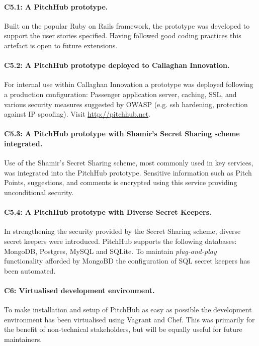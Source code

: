 \paragraph{C5.1: A PitchHub prototype.} 

Built on the popular Ruby on Rails framework, the prototype was developed to support the user stories specified. Having followed good coding practices this artefact is open to future extensions.

\paragraph{C5.2: A PitchHub prototype deployed to Callaghan Innovation.} 

For internal use within Callaghan Innovation a prototype was deployed following a production configuration: Passenger application server, caching, SSL, and various security measures suggested by OWASP (e.g. ssh hardening, protection against IP spoofing). Visit \url{http://pitchhub.net}.


\paragraph{C5.3: A PitchHub prototype with Shamir's Secret Sharing scheme integrated.} 

Use of the Shamir's Secret Sharing scheme, most commonly used in key services, was integrated into the PitchHub prototype. Sensitive information such as Pitch Points, suggestions, and comments is encrypted using this service providing unconditional security.

\paragraph{C5.4: A PitchHub prototype with Diverse Secret Keepers.} 

In strengthening the security provided by the Secret Sharing scheme, diverse secret keepers were introduced. PitchHub supports the following databases: MongoDB, Postgres, MySQL and SQLite. To maintain \textit{plug-and-play} functionality afforded by MongoBD the configuration of SQL secret keepers has been automated.

\paragraph{C6: Virtualised development environment.}

To make installation and setup of PitchHub as easy as possible the development environment has been virtualised using Vagrant and Chef. This was primarily for the benefit of non-technical stakeholders, but will be equally useful for future maintainers.

